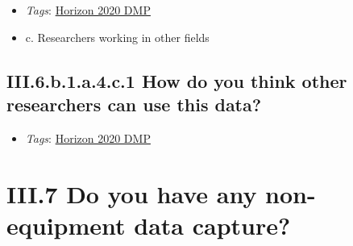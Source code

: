 \documentclass[a4paper,12pt]{report}
\begin{document}
\label{b1df3c74-0b1f-4574-81c4-4cc2d780c1af.f87c331d-794a-42c8-a910-61a2a9110dab.e4ca2d31-137a-46d3-96cd-3e9e8c5e9a76.f5fef09d-ade5-4019-b089-f05bd89c34bc.0c3ac72c-1f6a-4c3c-b8d2-6bf287367436.135aa977-ecc2-4bb8-aa55-2def9d9d6040}


\begin{itemize}
  \item \textit{Tags}: \ul{Horizon 2020 DMP}
  \end{itemize}




\begin{itemize}
  \item[\CheckmarkBold] c. Researchers working in other fields
\end{itemize}




\subsection*{\protect\textcolor{colorSecId}{III.6.b.1.a.4.c.1} How do you think other researchers can use this data?}

\label{b1df3c74-0b1f-4574-81c4-4cc2d780c1af.f87c331d-794a-42c8-a910-61a2a9110dab.e4ca2d31-137a-46d3-96cd-3e9e8c5e9a76.f5fef09d-ade5-4019-b089-f05bd89c34bc.0c3ac72c-1f6a-4c3c-b8d2-6bf287367436.135aa977-ecc2-4bb8-aa55-2def9d9d6040.9270c716-f997-43e1-bc2a-55687e149dbd.1ca28160-8b73-48fe-8b74-18c0f5cb56df}


\begin{itemize}
  \item \textit{Tags}: \ul{Horizon 2020 DMP}
  \end{itemize}








\section*{\protect\textcolor{colorSecId}{III.7} Do you have any non-equipment data capture?}
\end{document}
